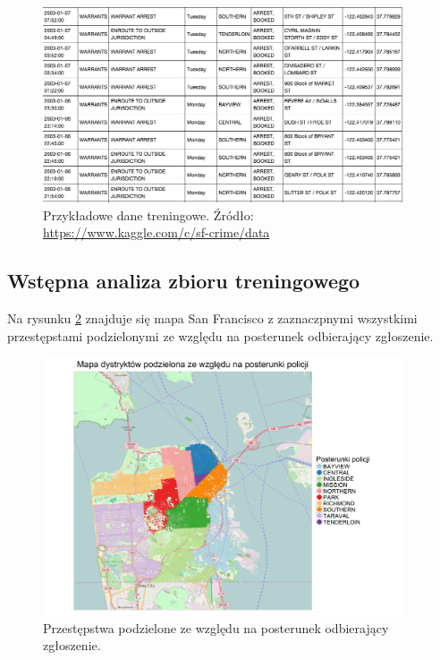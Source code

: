 \documentclass[11pt]{article} %
\begin{document}
\begin{figure}[!h]
  \centering
    \includegraphics[width=0.95\textwidth]{images/train_data.png}
  \caption{Przykładowe dane treningowe. Źródło: \protect\url{https://www.kaggle.com/c/sf-crime/data} } \label{fig:train_data}
\end{figure}



\subsection{Wstępna analiza zbioru treningowego}

Na rysunku \ref{fig:sf_districts} znajduje się mapa San Francisco z zaznaczpnymi wszystkimi przestępstami podzielonymi ze względu na posterunek odbierający zgłoszenie.


\begin{figure}[!h]
  \centering
    \includegraphics[width=0.95\textwidth]{images/sf_districts}
  \caption{Przestępstwa podzielone ze względu na posterunek odbierający zgłoszenie.} \label{fig:sf_districts}
\end{figure}
\end{document}
